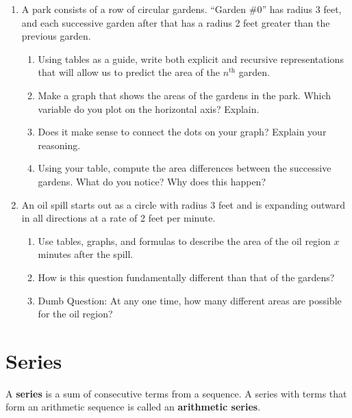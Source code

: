 \newpage
\begin{problems}
\begin{enumerate}

\item A park consists of a row of circular gardens.  ``Garden \#0'' has radius 3 feet, and each successive garden after that has a radius 2 feet greater than the previous garden.  
\begin{enumerate}
\item Using tables as a guide, write both explicit and recursive representations that will allow us to predict the area of the $n^\mathrm{th}$ garden.
\item Make a graph that shows the areas of the gardens in the park.  Which variable do you plot on the horizontal axis?  Explain.  
\item Does it make sense to connect the dots on your graph?  Explain your reasoning.  
\item Using your table, compute the area differences between the successive gardens.  What do you notice?  Why does this happen?
\end{enumerate}
\item An oil spill starts out as a circle with radius 3 feet and is expanding outward in all directions at a rate of 2 feet per minute. 
\begin{enumerate}
\item Use tables, graphs, and formulas to describe the area of the oil region $x$ minutes after the spill.  
\item How is this question fundamentally different than that of the gardens?  
\item Dumb Question:  At any one time, how many different areas are possible for the oil region?
\end{enumerate}

\end{enumerate}
\end{problems}

\newpage

\section{Series}  
\begin{definition}
A \textbf{series} is a sum of consecutive terms from a sequence.  A series with terms that form an arithmetic sequence is called an \textbf{arithmetic series}.  
\end{definition}


